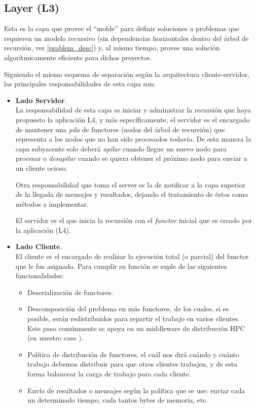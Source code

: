 \subsection{\rc{} Layer (L3)}

Esta es la capa que provee el ``molde'' para definir soluciones a problemas que requieren un modelo recursivo (sin dependencias
horizontales dentro del árbol de recursión, ver \ref{problem_desc}) y, al mismo tiempo, provee una solución algorítmicamente
eficiente para dichos proyectos.

Siguiendo el mismo esquema de separación según la arquitectura cliente-servidor, las principales responsabilidades de esta capa son:
\begin{itemize}
    \item   \textbf{Lado Servidor}.\\
            La responsabilidad de esta capa es iniciar y administrar la recursión que haya propuesto la aplicación L4, y más
            específicamente, el servidor es el encargado de mantener una \textit{pila} de functores (nodos del árbol de recursión) que
            representa a los nodos que no han sido procesados todavía. De esta manera la capa subyacente solo deberá \textit{apilar} cuando
            llegue un nuevo nodo para procesar o \textit{desapilar} cuando se quiera obtener el próximo nodo para enviar a un cliente
            ocioso.

            Otra responsabilidad que toma el server es la de notificar a la capa superior de la llegada de mensajes y resultados, dejando
            el tratamiento de éstos como métodos a implementar.

            El servidor es el que inicia la recursión con el \textit{functor} inicial que es creado por la aplicación (L4).
    \item   \textbf{Lado Cliente}.\\
            El cliente es el encargado de realizar la ejecución total (o parcial) del functor que le fue asignado. Para cumplir su función
            se suple de las siguientes funcionalidades:
            \begin{itemize}
                \item   Deserialización de functores.
                \item   Descomposición del problema en más functores, de los cuales, si es posible, serán redistribuidos para repartir el
                        trabajo en varios clientes. Este paso comúnmente se apoya en un middleware de distribución HPC (en nuestro caso
                        \fud).
                \item   Política de distribución de functores, el cuál nos dirá cuándo y cuánto trabajo debemos
                        distribuir para que otros
                        clientes trabajen, y de esta forma balancear la carga de trabajo para cada cliente.
                \item   Envío de resultados o mensajes según la política que se use: enviar cada un determinado tiempo, cada tantos
                        bytes de memoria, etc.
            \end{itemize}


\end{itemize}
